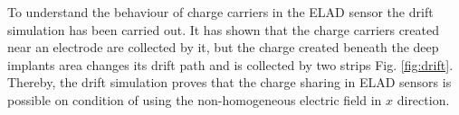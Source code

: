 To understand the behaviour of charge carriers in the ELAD sensor the drift simulation has been carried out. 
It has shown that the charge carriers created near an electrode are collected by it, but the charge created beneath the deep implants area
 changes its drift path and is collected by two strips Fig. \ref{fig:drift}.  
Thereby, the drift simulation proves that the charge sharing in ELAD sensors is possible on condition of using the non-homogeneous electric field in $x$ direction. 

\begin{figure}[H]
 \begin{minipage}[h]{0.24\linewidth}
 \end{minipage}
 \begin{minipage}[h]{0.24\linewidth}
 \end{minipage}
 \begin{minipage}[h]{0.24\linewidth}

\end{minipage}
\end{figure}
